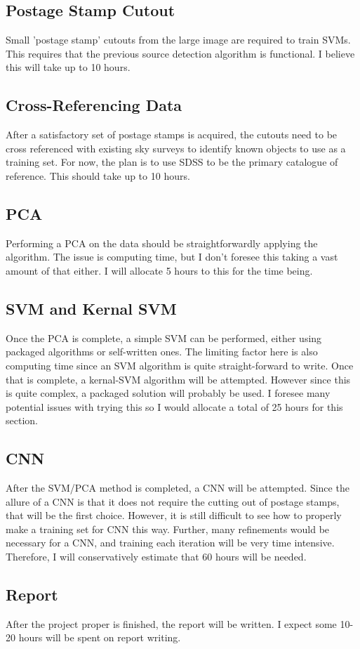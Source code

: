 \documentclass[a4paper,11pt]{article}
\begin{document}
\subsection{Postage Stamp Cutout}
Small 'postage stamp' cutouts from the large image are required to train SVMs. This requires that the previous source detection algorithm is functional. I believe this will take up to 10 hours. 
\subsection{Cross-Referencing Data}
After a satisfactory set of postage stamps is acquired, the cutouts need to be cross referenced with existing sky surveys to identify known objects to use as a training set. For now, the plan is to use SDSS to be the primary catalogue of reference. This should take up to 10 hours.
\subsection{PCA}
Performing a PCA on the data should be straightforwardly applying the algorithm. The issue is computing time, but I don't foresee this taking a vast amount of that either. I will allocate 5 hours to this for the time being.
\subsection{SVM and Kernal SVM}
Once the PCA is complete, a simple SVM can be performed, either using packaged algorithms or self-written ones. The limiting factor here is also computing time since an SVM algorithm is quite straight-forward to write.
Once that is complete, a kernal-SVM algorithm will be attempted. However since this is quite complex, a packaged solution will probably be used. I foresee many potential issues with trying this so I would allocate a total of 25 hours for this section.
\subsection{CNN}
After the SVM/PCA method is completed, a CNN will be attempted. Since the allure of a CNN is that it does not require the cutting out of postage stamps, that will be the first choice. However, it is still difficult to see how to properly make a training set for CNN this way. Further, many refinements would be necessary for a CNN, and training each iteration will be very time intensive. Therefore, I will conservatively estimate that 60 hours will be needed.
\subsection{Report}
After the project proper is finished, the report will be written. I expect some 10-20 hours will be spent on report writing.
\end{document}
